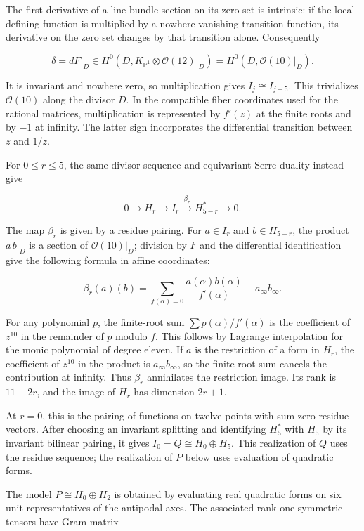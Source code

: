 \documentclass[11pt,a4paper]{article}
\begin{document}
The first derivative of a line-bundle section on its zero set is intrinsic: if the local defining function is multiplied by a nowhere-vanishing transition function, its derivative on the zero set changes by that transition alone. Consequently

\[
\delta=dF|_D\in H^0(D,K_{\mathbb P^1}\otimes\mathcal O(12)|_D)
=H^0(D,\mathcal O(10)|_D).
\]

It is invariant and nowhere zero, so multiplication gives \(I_j\cong I_{j+5}\). This trivializes \(\mathcal O(10)\) along the divisor \(D\). In the compatible fiber coordinates used for the rational matrices, multiplication is represented by \(f'(z)\) at the finite roots and by \(-1\) at infinity. The latter sign incorporates the differential transition between \(z\) and \(1/z\).

For \(0\le r\le5\), the same divisor sequence and equivariant Serre duality instead give

\[
0\longrightarrow H_r\longrightarrow I_r
\xrightarrow{\beta_r}H_{5-r}^{*}\longrightarrow0.
\]

The map \(\beta_r\) is given by a residue pairing. For \(a\in I_r\) and \(b\in H_{5-r}\), the product \(a\,b|_D\) is a section of \(\mathcal O(10)|_D\); division by \(F\) and the differential identification give the following formula in affine coordinates:

\[
\beta_r(a)(b)
=\sum_{f(\alpha)=0}\frac{a(\alpha)b(\alpha)}{f'(\alpha)}
-a_\infty b_\infty.
\]

For any polynomial \(p\), the finite-root sum \(\sum p(\alpha)/f'(\alpha)\) is the coefficient of \(z^{10}\) in the remainder of \(p\) modulo \(f\). This follows by Lagrange interpolation for the monic polynomial of degree eleven. If \(a\) is the restriction of a form in \(H_r\), the coefficient of \(z^{10}\) in the product is \(a_\infty b_\infty\), so the finite-root sum cancels the contribution at infinity. Thus \(\beta_r\) annihilates the restriction image. Its rank is \(11-2r\), and the image of \(H_r\) has dimension \(2r+1\).

At \(r=0\), this is the pairing of functions on twelve points with sum-zero residue vectors. After choosing an invariant splitting and identifying \(H_5^*\) with \(H_5\) by its invariant bilinear pairing, it gives \(I_0=Q\cong H_0\oplus H_5\). This realization of \(Q\) uses the residue sequence; the realization of \(P\) below uses evaluation of quadratic forms.

The model $P\cong H_0\oplus H_2$ is obtained by evaluating real quadratic forms on six unit representatives of the antipodal axes. The associated rank-one symmetric tensors have Gram matrix
\end{document}
